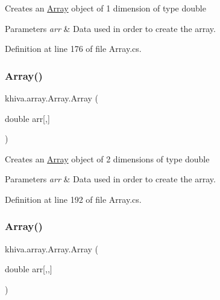 Creates an \mbox{\hyperlink{classkhiva_1_1array_1_1_array}{Array}} object of 1 dimension of type double 


\begin{DoxyParams}{Parameters}
{\em arr} & Data used in order to create the array.\\
\hline
\end{DoxyParams}


Definition at line 176 of file Array.\+cs.

\mbox{\label{classkhiva_1_1array_1_1_array_a1c7e8738b372e1302304407010e7ddb5}} 
\subsubsection{\texorpdfstring{Array()}{Array()}\hspace{0.1cm}{\footnotesize\ttfamily [6/46]}}
{\footnotesize\ttfamily khiva.\+array.\+Array.\+Array (\begin{DoxyParamCaption}\item[{double}]{arr\mbox{[},\mbox{]} }\end{DoxyParamCaption})\hspace{0.3cm}{\ttfamily [inline]}}



Creates an \mbox{\hyperlink{classkhiva_1_1array_1_1_array}{Array}} object of 2 dimensions of type double 


\begin{DoxyParams}{Parameters}
{\em arr} & Data used in order to create the array.\\
\hline
\end{DoxyParams}


Definition at line 192 of file Array.\+cs.

\mbox{\label{classkhiva_1_1array_1_1_array_ab9ff6c9b0d6aae4d478b652027f06cc7}} 
\subsubsection{\texorpdfstring{Array()}{Array()}\hspace{0.1cm}{\footnotesize\ttfamily [7/46]}}
{\footnotesize\ttfamily khiva.\+array.\+Array.\+Array (\begin{DoxyParamCaption}\item[{double}]{arr\mbox{[},,\mbox{]} }\end{DoxyParamCaption})\hspace{0.3cm}{\ttfamily [inline]}}



